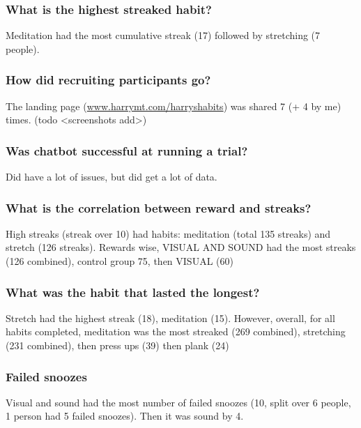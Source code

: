 \subsubsection*{What is the highest streaked habit?}
Meditation had the most cumulative streak (17) followed by stretching (7 people).


\subsubsection*{How did recruiting participants go?}
The landing page (\url{www.harrymt.com/harryshabits}) was shared 7 (+ 4 by me) times. (todo <screenshots add>)


\subsubsection*{Was chatbot successful at running a trial?}
Did have a lot of issues, but did get a lot of data.


\subsubsection*{What is the correlation between reward and streaks?}
High streaks (streak over 10) had habits: meditation (total 135 streaks) and stretch (126 streaks). Rewards wise, VISUAL AND SOUND had the most streaks (126 combined), control group 75, then VISUAL (60)


\subsubsection*{What was the habit that lasted the longest?}
Stretch had the highest streak (18), meditation (15). However, overall, for all habits completed, meditation was the most streaked (269 combined), stretching (231 combined), then press ups (39) then plank (24)

\subsubsection*{Failed snoozes}
Visual and sound had the most number of failed snoozes (10, split over 6 people, 1 person had 5 failed snoozes). Then it was sound by 4.



